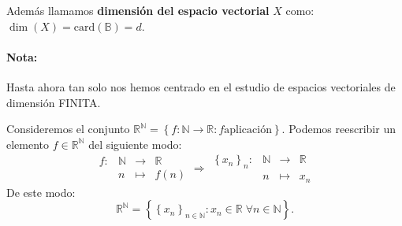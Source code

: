 Además llamamos \textbf{dimensión del espacio vectorial} $X$ como: $\dim(X)=\text{card}(\mathbb{B})=d$.

\paragraph{Nota:} Hasta ahora tan solo nos hemos centrado en el estudio de espacios vectoriales de dimensión FINITA.

\begin{ejem}
    Consideremos el conjunto $\mathbb{R}^{\mathbb{N}}=\left\{f:\mathbb{N}\to \mathbb{R}: f \text{aplicación}\right\}$. Podemos reescribir un elemento $f\in \mathbb{R}^{\mathbb{N}}$ del siguiente modo:
    $$
    \begin{array}{rccc}
	f:&\mathbb{N}&\to&\mathbb{R}\\
	  &n & \mapsto & f(n)
    \end{array}
    \Longrightarrow
    \begin{array}{rrcl}
	\left\{x_n\right\}_n:&\mathbb{N}&\to&\mathbb{R}\\
	 &n & \mapsto & x_n
    \end{array}
    $$
    De este modo:
    $$\mathbb{R}^{\mathbb{N}}=\left\{\left\{x_n\right\}_{n\in \mathbb{N}}:x_n\in \mathbb{R}\; \forall n \in \mathbb{N}\right\}.$$
\end{ejem}


